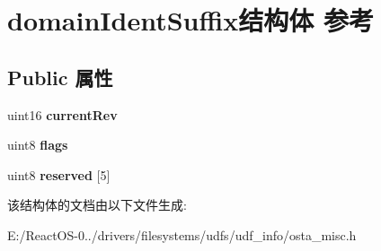 \hypertarget{structdomain_ident_suffix}{}\section{domain\+Ident\+Suffix结构体 参考}
\label{structdomain_ident_suffix}
\subsection*{Public 属性}
\begin{DoxyCompactItemize}
\item 
\mbox{\label{structdomain_ident_suffix_aeab5edd4992e447f254ba50f300a64e3}} 
uint16 {\bfseries current\+Rev}
\item 
\mbox{\label{structdomain_ident_suffix_a9519d99852f16df557bc984f435ae3ae}} 
uint8 {\bfseries flags}
\item 
\mbox{\label{structdomain_ident_suffix_ad336c47ca4e466e5a369cab31576f819}} 
uint8 {\bfseries reserved} \mbox{[}5\mbox{]}
\end{DoxyCompactItemize}


该结构体的文档由以下文件生成\+:\begin{DoxyCompactItemize}
\item 
E\+:/\+React\+O\+S-\/0../drivers/filesystems/udfs/udf\+\_\+info/osta\+\_\+misc.\+h\end{DoxyCompactItemize}
